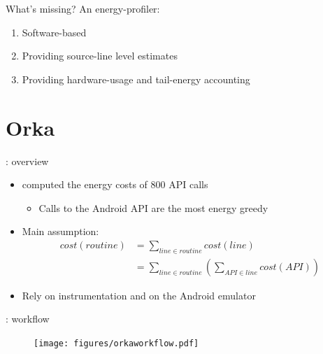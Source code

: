 %
%
\begin{frame}{What's missing?}
An energy-profiler:
\begin{enumerate}
\item \alert{Software-based}
\item Providing \alert{source-line level} estimates
\item Providing hardware-usage and \alert{tail-energy} accounting
\end{enumerate}
\end{frame}
%
%
\section{Orka}
\begin{frame}{\orka{}: overview}
\begin{itemize}
\item \lv{} computed the energy costs of 800 API calls
\begin{itemize}
\item Calls to the Android API are the most energy greedy
\end{itemize}
\item Main assumption:
\begin{align*}
cost(routine) &= \sum_{line \in routine} cost(line) \\
&=  \sum_{line \in routine} \left( \sum_{API \in line} cost(API) \right)
\end{align*}
\item Rely on \alert{instrumentation} and on the Android \alert{emulator}
\end{itemize}
\end{frame}
%
%
\begin{frame}{\orka{}: workflow}
\begin{figure}
        \texttt{[image: figures/orkaworkflow.pdf]}
\end{figure}
\end{frame}
%
%
